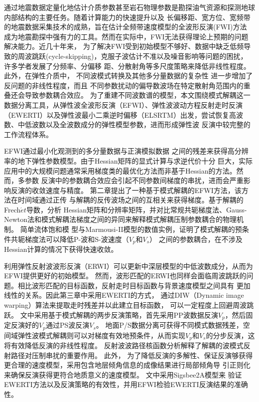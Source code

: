 \begin{cabstract}
	通过地震数据定量化地估计介质参数甚至岩石物理参数是勘探油气资源和探测地球内部结构的主要任务。随着计算能力的快速提升以及
	长偏移距、宽方位、宽频带的地震数据采集技术的成熟，旨在估计全频带速度模型的全波形反演(FWI)方法
	成为地震勘探中强有力的工具。然而在实际中，FWI无法获得理论上预期的问题解决能力。近几十年来，
	为了解决FWI受到初始模型不够好、数据中缺乏低频导致的周波跳跃(cycle-skipping)，克服子波估计不准以及噪音影响等问题的困扰，
	许多学者发展了分频率、分偏移
	距、分散射角等多尺度策略来降低非线性程度。此外，在弹性介质中，
	不同波模式转换及其他多分量数据的复杂性
	进一步增加了反问题的非线性程度，而且
	不同参数扰动的偏导数波场在特定散射角范围内的重叠还会导致参数耦合效应。
	为了重建不同波数谱的模型，本文围绕模式解耦这一数据分离工具，从弹性波全波形反演（EFWI）、弹性波波动方程反射走时反演
	（EWERTI）以及弹性波最小二乘逆时偏移（ELSRTM）出发，尝试恢复高波数、中低波数以及全波数成分的弹性模型参数，进而形成弹性波
	反演中较完整的工作流程体系。

	EFWI通过最小化观测到的多分量数据与正演模拟数据
	之间的残差来获得高分辨率的地下弹性参数模型。由于Hessian矩阵的显式计算与求逆代价十分
	巨大，实际应用中的大规模问题通常采用梯度类的最优化方法而非基于Hessian的方法。然而，多参数
	反演中的参数耦合效应会引起不同参数间梯度的串扰，进而会严重影响反演的收敛速度与精度。
	第二章提出了一种基于模式解耦的EFWI方法，该方法在时间域通过正传
	与解耦的反传波场之间的互相关来获得梯度。基于解耦的Frech$\acute{e}t$导数，分析
	Hessian矩阵和分辨率矩阵，并对比常规共轭梯度法、Gauss-Newton法和模式解耦法梯度之间的异同来解释模式解耦压制参数耦合的物理机制。
	简单流体饱和模
	型与Marmousi-II模型的数值实例，证明了模式解耦的预条件共轭梯度法可以降低P-波和S-波速度（$V_p$和$V_s$）
	之间的参数耦合，在不涉及Hessian计算的情况下获得快速收敛。

	利用弹性反射波波形反演（ERWI）可以更新中深层模型的中低波数成分，从而为EFWI提供更好的初始模型。
	然而，波形匹配的ERWI也同样会面临周波跳跃的问题。相比波形匹配的目标函数，反射走时目标函数与背景速度模型之间具有
	更加线性的关系。因此第三章中采用EWERTI的方式，
	通过DIW（Dynamic image warping）算法来提取走时残差并以此建立目标函数，
	可以一定程度上回避周波跳跃。
	文中采用基于模式解耦的两步反演策略，首先采用PP波数据反演$V_p$，然后固定反演好的$V_p$通过PS波反演$V_s$。
	地面P/S数据分离可获得不同模式数据残差，空间域弹性波模式解耦则可以对梯度有效地预条件，从而实现$V_p$和$V_s$的分步反演，这将有效降低反演的非线性程度。
	反射波波路径核函数分析解释了解耦的波模式反射路径对压制串扰的重要作用。
	此外，
	为了降低反演的多解性、保证反演够获得更合理的速度模型，采用包含地层倾角信息的成像结果进行局部倾角导
	引正则化来确保反演获得更符合地质意义的速度模型。
	文中采用Sigsbee2A模型来
	验证EWERTI方法以及反演策略的有效性，并用EFWI检验EWERTI反演结果的准确性。


\end{cabstract}
